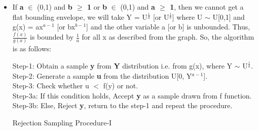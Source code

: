 \documentclass[12pt,a4paper]{article}
\begin{document}
\begin{itemize}
    \item
    If \textbf{a} $\in$ (0,1) and \textbf{b $\geq$ 1} or \textbf{b} $\in$ (0,1) and \textbf{a $\geq$ 1}, then we cannot get a flat bounding envelope, we will take Y = U$^{\frac{1}{a}}$ [or U$^{\frac{1}{b}}$] where U $\sim$ U[0,1] and g(x) = ax$^{a-1}$ [or bx$^{b-1}$] and the other variable a [or b] is unbounded.
    \newline
    Thus, $\frac{f(x)}{g(x)}$ is bounded by $\frac{1}{a}$ for all x as described from the graph. So, the algorithm is as follows:
    \begin{algorithm}[H]
    Step-1: Obtain a sample \textbf{y} from \textbf{Y} distribution i.e. from g(x), where Y $\sim$ U$^\frac{1}{a}$.\;
    \\Step-2: Generate a sample \textbf{u} from the distribution U[0, Y$^{a-1}$].\; 
    \\Step-3:  Check whether u $<$ f(y) or not.
    \\\hfill Step-3a: If this condition holds, Accept \textbf{y} as a sample drawn from f function.\;
    \\\hfill Step-3b: Else, Reject \textbf{y}, return to the step-1 and repeat the procedure.\;
    \caption{Rejection Sampling Procedure-I}
    \end{algorithm}
\end{itemize}
\end{document}
